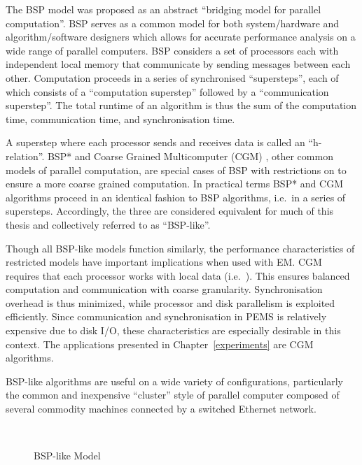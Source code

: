 \documentclass[12pt]{carletoncsthesis}
\begin{document}
The BSP model \cite{bsp} was proposed as an abstract ``bridging model for
parallel computation''.  BSP serves as a common model for both system/hardware
and algorithm/software designers which allows for accurate performance analysis
on a wide range of parallel computers.  BSP considers a set of processors
each with independent local memory that communicate by sending messages
between each other.  Computation proceeds in a series of synchronised
``supersteps'', each of which consists of a ``computation superstep'' followed
by a ``communication superstep''.  The total runtime of an algorithm is thus
the sum of the computation time, communication time, and synchronisation time.

A superstep where each processor sends and receives  data is called an
``h-relation''.  BSP* \cite{bsp*} and Coarse Grained Multicomputer (CGM)
\cite{cgm}, other common models of parallel computation, are special cases
of BSP with restrictions on  to ensure a more coarse grained computation.
In practical terms BSP* and CGM algorithms proceed in an identical fashion
to BSP algorithms, i.e.\ in a series of supersteps.  Accordingly, the three
are considered equivalent for much of this thesis and collectively referred
to as ``BSP-like''.

Though all BSP-like models function similarly, the performance characteristics
of restricted models have important implications when used with EM.
CGM requires that each processor works with  local data
(i.e.\ ).  This ensures balanced computation and
communication with coarse granularity.  Synchronisation overhead is thus
minimized, while processor and disk parallelism is exploited efficiently.
Since communication and synchronisation in PEMS is relatively expensive due
to disk I/O, these characteristics are especially desirable in this context.
The applications presented in Chapter~\ref{experiments} are CGM algorithms.

BSP-like algorithms are useful on a wide variety of configurations,
particularly the common and inexpensive ``cluster'' style of parallel
computer composed of several commodity machines connected by a switched
Ethernet network.

\begin{figure}[h]
\begin{center}
	 \\
\end{center}
\caption{BSP-like Model}
\label{bsp_model}
\end{figure}
\end{document}
